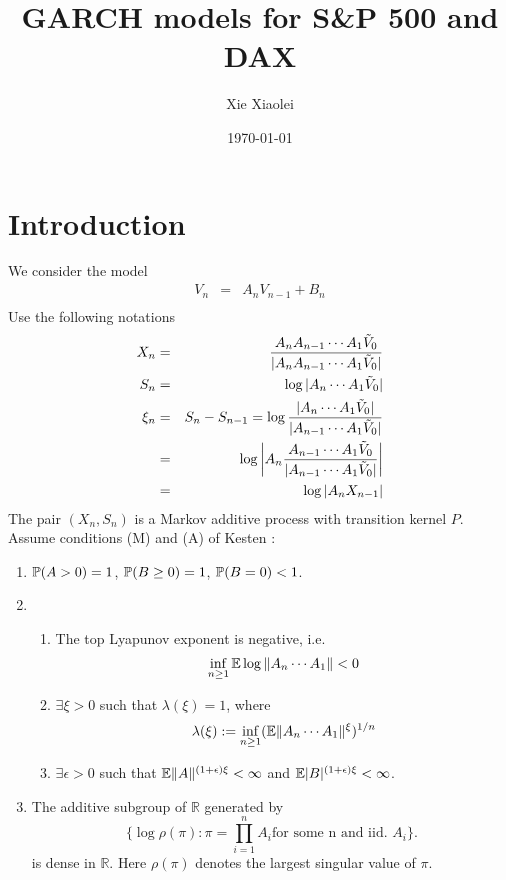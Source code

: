 \documentclass{article}
\title{GARCH models for S\&P 500 and DAX}
\author{Xie Xiaolei}
\date{\today}
\theoremstyle{remark}
\newif\ifcomplete
\begin{document}
\maketitle

\ifcomplete
\section{Introduction}
We consider the model
\begin{eqnarray*}
V_n &=& A_n V_{n-1} + B_n\\
\end{eqnarray*}
Use the following notations
\begin{eqnarray*}
X_n &=& {
        A_n A_{n-1} \cdots A_1 \tilde V_0
        \over
        |A_n A_{n-1} \cdots A_1 \tilde V_0|
        } \\
S_n &=& \log |A_n \cdots A_1 \tilde V_0| \\
\xi_n &=& S_n - S_{n-1} = \log\frac{|A_n \cdots A_1 \tilde V_0|}{|A_{n-1}
  \cdots A_1 \tilde V_0|} \\
&=& \log\left| A_n \frac{A_{n-1} \cdots A_1 \tilde V_0}
    {|A_{n-1} \cdots A_1 \tilde V_0|} \right|\\
&=& \log |A_n X_{n-1}|
\end{eqnarray*}
The pair $(X_n, S_n)$ is a Markov additive process with transition
kernel $P$. Assume conditions (M) and (A) of Kesten \cite{Kesten1973}:
\begin{enumerate}
  \item $\P(A > 0) = 1$, $\P(B \geq 0) = 1$, $\P(B = 0) < 1$.
   
\item
  \begin{enumerate}
  \item The top Lyapunov exponent is negative, i.e.
    \begin{equation}
      \label{eq:neg_top_Lyapunov}
      \inf_{n \geq 1} \E \log \|A_n \cdots A_1\| < 0    
    \end{equation}
  \item $\exists \xi > 0$ such that $\lambda(\xi) = 1$, where
    $$
    \lambda(\xi) := \inf_{n \geq 1} (\E \|A_n \cdots A_1\|^\xi)^{1/n}
    $$
    \item $\exists \epsilon > 0$ such that $\E \|A\|^{(1 + \epsilon)\xi} <
      \infty$ and $\E |B|^{(1 + \epsilon)\xi} < \infty$.
  \end{enumerate}
  \item The additive subgroup of $\mathbb R$ generated by
    \[
    \{\log \rho(\pi): \pi = \prod_{i=1}^n A_i \text{for some n and
      iid. } A_i\}.
    \]
    is dense in $\mathbb R$. Here $\rho(\pi)$ denotes the largest
    singular value of $\pi$.
\end{enumerate}
\end{document}
